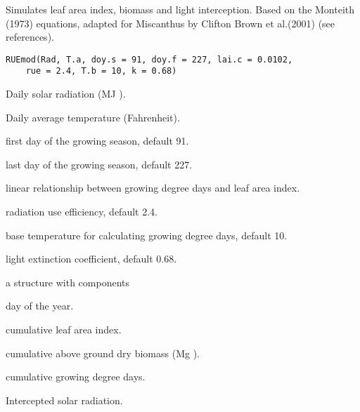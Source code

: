 \documentclass[letterpaper]{book}
\begin{document}
%
\begin{Description}\relax
Simulates leaf area index, biomass and light interception.
Based on the Monteith (1973) equations, adapted for Miscanthus
by Clifton Brown et al.(2001) (see references). 
\end{Description}
%
\begin{Usage}
\begin{verbatim}
RUEmod(Rad, T.a, doy.s = 91, doy.f = 227, lai.c = 0.0102, 
    rue = 2.4, T.b = 10, k = 0.68) 
\end{verbatim}
\end{Usage}
%
\begin{Arguments}
\begin{ldescription}

\item[\code{Rad}] Daily solar radiation (MJ ).
\item[\code{T.a}] Daily average temperature (Fahrenheit).
\item[\code{doy.s}] first day of the growing season, default 91.
\item[\code{doy.f}] last day of the growing season, default 227.
\item[\code{lai.c}] linear relationship between growing degree days and leaf area index.
\item[\code{rue}] radiation use efficiency, default 2.4.
\item[\code{T.b}] base temperature for calculating growing degree days, default 10.
\item[\code{k}] light extinction coefficient, default 0.68.
\end{ldescription}
\end{Arguments}
%
\begin{Value}
a  structure with components
\begin{ldescription}
\item[\code{doy}] day of the year.
\item[\code{lai.cum}] cumulative leaf area index.
\item[\code{AG.cum}] cumulative above ground dry biomass (Mg ).
\item[\code{AGDD}] cumulative growing degree days.
\item[\code{Int.e}] Intercepted solar radiation.
\end{ldescription}
\end{Value}
\end{document}
